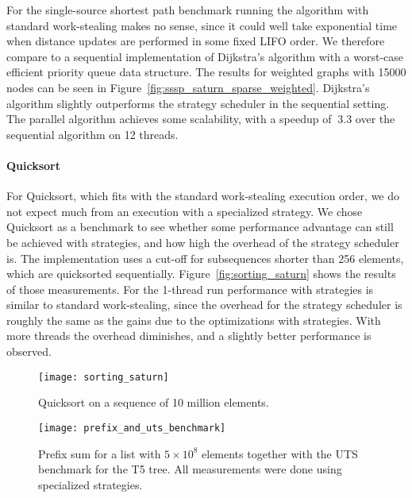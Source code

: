 \documentclass[a4paper,11pt]{article}
\begin{document}
For the single-source shortest path benchmark running the algorithm
with standard work-stealing makes no sense, since it could well take
exponential time when distance updates are performed in some fixed
LIFO order.  We therefore compare to a sequential implementation of
Dijkstra's algorithm with a worst-case efficient priority queue data
structure. The results for weighted graphs with 15000 nodes can be
seen in Figure~\ref{fig:sssp_saturn_sparse_weighted}. Dijkstra's
algorithm slightly outperforms the strategy scheduler in the
sequential setting. The parallel algorithm achieves some scalability,
with a speedup of $~3.3$ over the sequential algorithm on 12 threads.

\paragraph{Quicksort}

For Quicksort, which fits with the standard work-stealing execution
order, we do not expect much from an execution with a specialized
strategy. We chose Quicksort as a benchmark to see whether some
performance advantage can still be achieved with strategies, and how
high the overhead of the strategy scheduler is. The implementation
uses a cut-off for subsequences shorter than 256 elements, which are
quicksorted sequentially. Figure~\ref{fig:sorting_saturn} shows the
results of those measurements. For the 1-thread run performance with
strategies is similar to standard work-stealing, since the overhead
for the strategy scheduler is roughly the same as the gains due to the
optimizations with strategies. With more threads the overhead
diminishes, and a slightly better performance is observed.

\begin{figure}
\centering
\begin{minipage}[t]{0.45\textwidth}
\texttt{[image: sorting\_saturn]}
\caption{Quicksort on a sequence of 10 million elements.}
\label{fig:sorting_saturn}
\end{minipage}
\hspace{0.05\textwidth}
\begin{minipage}[t]{0.45\textwidth}
\texttt{[image: prefix\_and\_uts\_benchmark]}
\caption{Prefix sum for a list with $5\times10^8$ elements together with the UTS benchmark for the T5 tree. All measurements were done using specialized strategies.}
\label{fig:prefix_and_uts_benchmark}
\end{minipage}
\end{figure}
\end{document}

